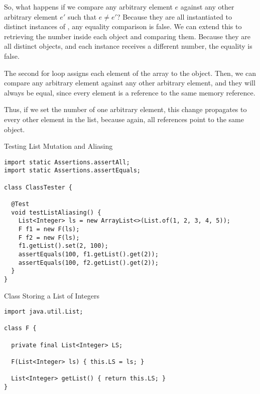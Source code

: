 So, what happens if we compare any arbitrary element $e$ against any other arbitrary element $e'$ such that $e \neq e'$? Because they are all instantiated to distinct instances of , any equality comparison is false. We can extend this to retrieving the number inside each  object and comparing them. Because they are all distinct objects, and each  instance receives a different number, the equality is false.

The second for loop assigns each element of the array to the  object. Then, we can compare any arbitrary element against any other arbitrary element, and they will always be equal, since every element is a reference to the same memory reference. 

Thus, if we set the number of one arbitrary element, this change propagates to every other element in the list, because again, all references point to the same object.


\begin{cl}[]{Testing List Mutation and Aliasing}
\begin{lstlisting}[language=MyJava]
import static Assertions.assertAll;
import static Assertions.assertEquals;

class ClassTester {

  @Test
  void testListAliasing() {
    List<Integer> ls = new ArrayList<>(List.of(1, 2, 3, 4, 5));
    F f1 = new F(ls);
    F f2 = new F(ls);
    f1.getList().set(2, 100);
    assertEquals(100, f1.getList().get(2));
    assertEquals(100, f2.getList().get(2));
  }
}
\end{lstlisting}
\end{cl}

\begin{cl}[]{Class Storing a List of Integers}
\begin{lstlisting}[language=MyJava]
import java.util.List;

class F {
  
  private final List<Integer> LS;
  
  F(List<Integer> ls) { this.LS = ls; }
  
  List<Integer> getList() { return this.LS; }
}
\end{lstlisting}
\end{cl}

